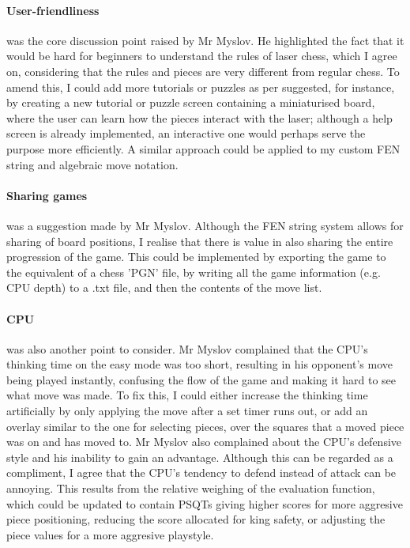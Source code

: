 \documentclass[../main/main.tex]{subfiles}
\begin{document}
\paragraph{User-friendliness} was the core discussion point raised by Mr Myslov. He highlighted the fact that it would be hard for beginners to understand the rules of laser chess, which I agree on, considering that the rules and pieces are very different from regular chess.  To amend this, I could add more tutorials or puzzles as per suggested, for instance, by creating a new tutorial or puzzle screen containing a miniaturised board, where the user can learn how the pieces interact with the laser; although a help screen is already implemented, an interactive one would perhaps serve the purpose more efficiently. A similar approach could be applied to my custom FEN string and algebraic move notation.

\paragraph{Sharing games} was a suggestion made by Mr Myslov. Although the FEN string system allows for sharing of board positions, I realise that there is value in also sharing the entire progression of the game. This could be implemented by exporting the game to the equivalent of a chess 'PGN' file, by writing all the game information (e.g. CPU depth) to a .txt file, and then the contents of the move list.

\paragraph{CPU} was also another point to consider. Mr Myslov complained that the CPU's thinking time on the easy mode was too short, resulting in his opponent's move being played instantly, confusing the flow of the game and making it hard to see what move was made. To fix this, I could either increase the thinking time artificially by only applying the move after a set timer runs out, or add an overlay similar to the one for selecting pieces, over the squares that a moved piece was on and has moved to. Mr Myslov also complained about the CPU's defensive style and his inability to gain an advantage. Although this can be regarded as a compliment, I agree that the CPU's tendency to defend instead of attack can be annoying. This results from the relative weighing of the evaluation function, which could be updated to contain PSQTs giving higher scores for more aggresive piece positioning, reducing the score allocated for king safety, or adjusting the piece values for a more aggresive playstyle.
\end{document}
